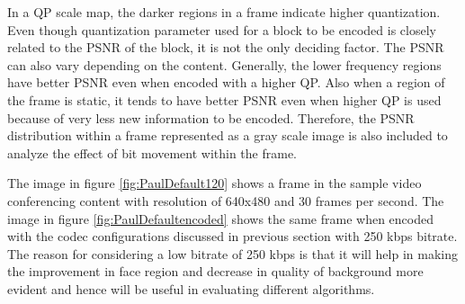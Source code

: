 \documentclass[11pt]{article} %
\begin{document}
In a QP scale map, the darker regions in a frame indicate higher quantization. Even though quantization parameter used for a block to be encoded is closely related to the PSNR of the block, it is not the only deciding factor. The PSNR can also vary depending on the content. Generally, the lower frequency regions have better PSNR even when encoded with a higher QP. Also when a region of the frame is static, it tends to have better PSNR even when higher QP is used because of very less new information to be encoded. Therefore, the PSNR distribution within a frame represented as a gray scale image is also included to analyze the effect of bit movement within the frame.

The image in figure \ref{fig:PaulDefault120} shows a frame in the sample video conferencing content with resolution of 640x480 and 30 frames per second. The image in figure \ref{fig:PaulDefaultencoded} shows the same frame when encoded with the codec configurations discussed in previous section with 250 kbps bitrate. The reason for considering a low bitrate of 250 kbps is that it will help in making the improvement in face region and decrease in quality of background more evident and hence will be useful in evaluating different algorithms. 
\end{document}
